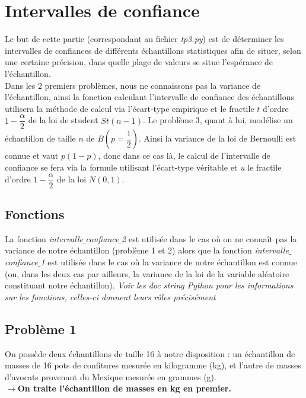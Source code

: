 \documentclass{article}      %
\begin{document}
\section{Intervalles de confiance}
Le but de cette partie (correspondant au fichier \textsl{tp3.py}) est de déterminer les intervalles de confiances de différents échantillons statistiques afin de situer, selon une certaine précision, dans quelle plage de valeurs se situe l'espérance de l'échantillon.\\
Dans les 2 premiers problèmes, nous ne connaissons pas la variance de l'échantillon, ainsi la fonction calculant l'intervalle de confiance des échantillons utilisera la méthode de calcul via l'écart-type empirique et le fractile $t$ d'ordre $1-\dfrac{\alpha}{2}$ de la loi de student $St(n-1)$. Le problème 3, quant à lui, modélise un échantillon de taille $n$ de $B(p = \dfrac{1}{2})$. Ainsi la variance de la loi de Bernoulli est connue et vaut $p(1-p)$, donc dans ce cas là, le calcul de l'intervalle de confiance se fera via la formule utilisant l'écart-type véritable et \textit{u} le fractile d'ordre $1-\dfrac{\alpha}{2}$ de la loi $N(0,1)$.

\subsection{Fonctions}

La fonction \textit{intervalle$\_$confiance$\_$2} est utilisée dans le cas où on ne connaît pas la variance de notre échantillon (problème 1 et 2) alors que la fonction \textit{intervalle$\_$confiance$\_$1} est utilisée dans le cas où la variance de notre échantillon est connue (ou, dans les deux cas par ailleurs, la variance de la loi de la variable aléatoire constituant notre échantillon).
\textit{Voir les doc string Python pour les informations sur les fonctions, celles-ci donnent leurs rôles précisément}

\subsection{Problème 1}
On possède deux échantillons de taille 16 à notre disposition : un échantillon de masses de 16 pots de confitures mesurée en kilogramme (kg), et l'autre de masses d'avocats provenant du Mexique mesurée en grammes (g).\\

\textbf{$\rightarrow$On traite l'échantillon de masses en kg en premier.}\\
\end{document}
